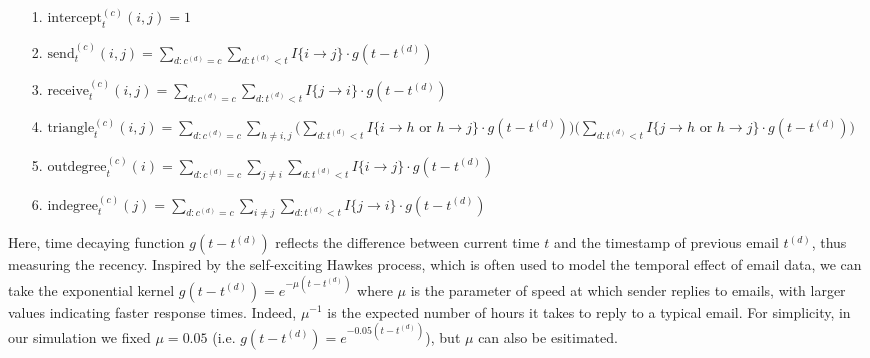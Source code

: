 \documentclass[a4paper]{article}
\begin{document}
 \begin{itemize}[leftmargin=*,rightmargin=-1cm]
 	\item [1.] $\mbox{intercept}^{(c)}_t(i, j) = 1$
 	\item [2.]  $\mbox{send}^{(c)}_t(i, j)=\sum\limits_{d: c^{(d)}=c}\sum\limits_{d: t^{(d)}<t} I\{i\rightarrow j\}\cdot g(t-t^{(d)})$
 	\item [3.] $\mbox{receive}^{(c)}_t(i, j)=\sum\limits_{d: c^{(d)}=c}\sum\limits_{d: t^{(d)}<t} I\{j\rightarrow i\}\cdot g(t-t^{(d)})$
 	\item [4.] $\mbox{triangle}^{(c)}_t(i, j)=\sum\limits_{d: c^{(d)}=c}\sum\limits_{h \neq i, j}\Big(\sum\limits_{d: t^{(d)}<t}  I\{i\rightarrow h \mbox{ or } h\rightarrow j \}\cdot g(t-t^{(d)})\Big)\Big(\sum\limits_{d: t^{(d)}<t} I\{j\rightarrow h \mbox{ or } h\rightarrow j\}\cdot g(t-t^{(d)})\Big)$
 	\item [5.]  $\mbox{outdegree}^{(c)}_t(i)=\sum\limits_{d: c^{(d)}=c}\sum\limits_{j\neq i}\sum\limits_{d: t^{(d)}<t} I\{i\rightarrow j\}\cdot g(t-t^{(d)})$
 	\item [6.] $\mbox{indegree}^{(c)}_t(j)=\sum\limits_{d: c^{(d)}=c}\sum\limits_{i \neq j}\sum\limits_{d: t^{(d)}<t} I\{j\rightarrow i\}\cdot g(t-t^{(d)})$
 \end{itemize}
\vspace{3mm}
Here, time decaying function $g(t-t^{(d)})$ reflects the difference between current time $t$ and the timestamp of previous email $t^{(d)}$, thus measuring the recency. Inspired by the self-exciting Hawkes process, which is often used to model the temporal effect of email data, we can take the exponential kernel $g(t-t^{(d)})=e^{-\mu(t-t^{(d)})}$ where $\mu$ is the parameter of speed at which sender replies to emails, with larger values indicating faster response times. Indeed, $\mu^{-1}$ is the expected number of hours it takes to reply to a typical email. For simplicity, in our simulation we fixed $\mu=0.05$ (i.e. $g(t-t^{(d)})=e^{-0.05(t-t^{(d)})}$), but $\mu$ can also be esitimated.
\end{document}
